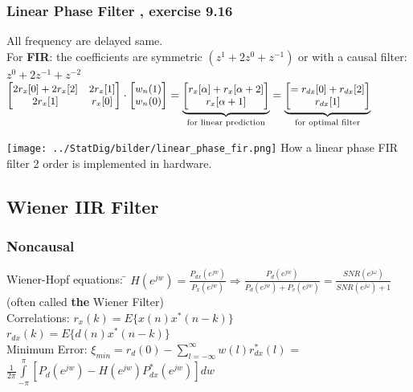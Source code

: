 \begin{minipage}{11.5cm}
\subsubsection{Linear Phase Filter , exercise 9.16} 
All frequency are delayed same. \\
For \textbf{FIR}: the coefficients are symmetric $(z^1+2z^0+z^{-1})$ or with a causal filter: $z^0 + 2z^{-1} + z^{-2}$\\
$\small \begin{bmatrix}
2 r_x[0] + 2 r_x[2]		&	2 r_x[1] \\
2 r_x[1]				& 	r_x[0]
\end{bmatrix} \cdot \begin{bmatrix}
w_n(1)\\
w_n(0)
\end{bmatrix}= \underbrace{ \begin{bmatrix}
r_x[\alpha] + r_x[\alpha+2]\\
r_x[\alpha+1]
\end{bmatrix}}_{\text{for linear prediction} } 
= \underbrace{ \begin{bmatrix} = 
r_{dx}[0] + r_{dx}[2]\\
r_{dx}[1]
\end{bmatrix}    }_{\text{for optimal filter} }  $

\end{minipage}
\hspace{3mm}
\begin{minipage}{7cm}
\texttt{[image: ../StatDig/bilder/linear\_phase\_fir.png]}
How a linear phase FIR filter 2 order is implemented in hardware.
\end{minipage}
\subsection{Wiener IIR Filter}
\begin{minipage}{8cm}
\subsubsection{Noncausal }
\begin{tabbing}
Wiener-Hopf equations: \=
$H(e^{jw})=\frac{P_{dx}(e^{jw})}{P_{x}(e^{jw})}  \Rightarrow
\frac{P_{d}(e^{jw})}{P_{d}(e^{jw}) + P_{v}(e^{jw})}= \frac{SNR(e^{j\omega})}{SNR(e^{j\omega}) + 1}$ (often called \textbf{the} Wiener Filter) \\

Correlations: \>
	$r_x(k) =E \{ x(n)x^{*}(n-k) \} $\\ 
	\>$r_{dx}(k) =E\{d(n)x^{*}(n-k)\}$\\


Minimum Error:\>
	$\xi_{min} =r_d(0)-\sum \limits_{l=-\infty}^\infty w(l)r_{dx}^{*}(l)$
	=$\frac{1}{2\pi}\int \limits_{-\pi}^\pi[P_d(e^{jw})-H(e^{jw})P_{dx}^{*}(e^{jw})]dw$
\end{tabbing}

\end{minipage}

